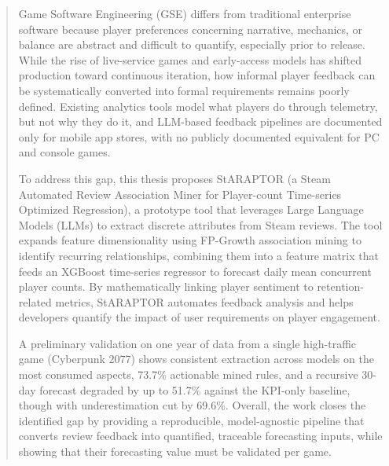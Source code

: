\begin{titlepage}
\begin{abstract}
%
Game Software Engineering (GSE) differs from traditional enterprise software because player preferences concerning narrative, mechanics, or balance are abstract and difficult to quantify, especially prior to release. While the rise of live-service games and early-access models has shifted production toward continuous iteration, how informal player feedback can be systematically converted into formal requirements remains poorly defined. Existing analytics tools model what players do through telemetry, but not why they do it, and LLM-based feedback pipelines are documented only for mobile app stores, with no publicly documented equivalent for PC and console games.

To address this gap, this thesis proposes StARAPTOR (a Steam Automated Review Association Miner for Player-count Time-series Optimized Regression), a prototype tool that leverages Large Language Models (LLMs) to extract discrete attributes from Steam reviews. The tool expands feature dimensionality using FP-Growth association mining to identify recurring relationships, combining them into a feature matrix that feeds an XGBoost time-series regressor to forecast daily mean concurrent player counts. By mathematically linking player sentiment to retention-related metrics, StARAPTOR automates feedback analysis and helps developers quantify the impact of user requirements on player engagement.

A preliminary validation on one year of data from a single high-traffic game (Cyberpunk 2077) shows consistent extraction across models on the most consumed aspects, 73.7\% actionable mined rules, and a recursive 30-day forecast degraded by up to 51.7\% against the KPI-only baseline, though with underestimation cut by 69.6\%. Overall, the work closes the identified gap by providing a reproducible, model-agnostic pipeline that converts review feedback into quantified, traceable forecasting inputs, while showing that their forecasting value must be validated per game.
%
\\[1cm]
\end{abstract}
\end{titlepage}